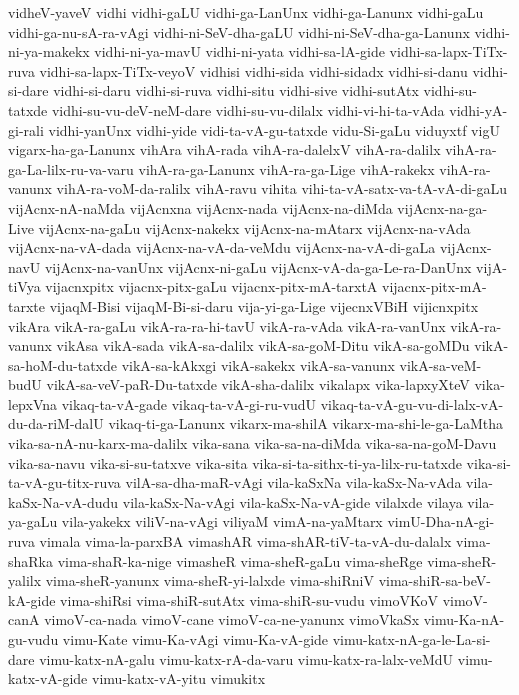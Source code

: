 {vidheV-yaveV
vidhi
vidhi-gaLU
vidhi-ga-LanUnx
vidhi-ga-Lanunx
vidhi-gaLu
vidhi-ga-nu-sA-ra-vAgi
vidhi-ni-SeV-dha-gaLU
vidhi-ni-SeV-dha-ga-Lanunx
vidhi-ni-ya-makekx
vidhi-ni-ya-mavU
vidhi-ni-yata
vidhi-sa-lA-gide
vidhi-sa-lapx-TiTx-ruva
vidhi-sa-lapx-TiTx-veyoV
vidhisi
vidhi-sida
vidhi-sidadx
vidhi-si-danu
vidhi-si-dare
vidhi-si-daru
vidhi-si-ruva
vidhi-situ
vidhi-sive
vidhi-sutAtx
vidhi-su-tatxde
vidhi-su-vu-deV-neM-dare
vidhi-su-vu-dilalx
vidhi-vi-hi-ta-vAda
vidhi-yA-gi-rali
vidhi-yanUnx
vidhi-yide
vidi-ta-vA-gu-tatxde
vidu-Si-gaLu
viduyxtf
vigU
vigarx-ha-ga-Lanunx
vihAra
vihA-rada
vihA-ra-dalelxV
vihA-ra-dalilx
vihA-ra-ga-La-lilx-ru-va-varu
vihA-ra-ga-Lanunx
vihA-ra-ga-Lige
vihA-rakekx
vihA-ra-vanunx
vihA-ra-voM-da-ralilx
vihA-ravu
vihita
vihi-ta-vA-satx-va-tA-vA-di-gaLu
vijAcnx-nA-naMda
vijAcnxna
vijAcnx-nada
vijAcnx-na-diMda
vijAcnx-na-ga-Live
vijAcnx-na-gaLu
vijAcnx-nakekx
vijAcnx-na-mAtarx
vijAcnx-na-vAda
vijAcnx-na-vA-dada
vijAcnx-na-vA-da-veMdu
vijAcnx-na-vA-di-gaLa
vijAcnx-navU
vijAcnx-na-vanUnx
vijAcnx-ni-gaLu
vijAcnx-vA-da-ga-Le-ra-DanUnx
vijA-tiVya
vijacnxpitx
vijacnx-pitx-gaLu
vijacnx-pitx-mA-tarxtA
vijacnx-pitx-mA-tarxte
vijaqM-Bisi
vijaqM-Bi-si-daru
vija-yi-ga-Lige
vijecnxVBiH
vijicnxpitx
vikAra
vikA-ra-gaLu
vikA-ra-ra-hi-tavU
vikA-ra-vAda
vikA-ra-vanUnx
vikA-ra-vanunx
vikAsa
vikA-sada
vikA-sa-dalilx
vikA-sa-goM-Ditu
vikA-sa-goMDu
vikA-sa-hoM-du-tatxde
vikA-sa-kAkxgi
vikA-sakekx
vikA-sa-vanunx
vikA-sa-veM-budU
vikA-sa-veV-paR-Du-tatxde
vikA-sha-dalilx
vikalapx
vika-lapxyXteV
vika-lepxVna
vikaq-ta-vA-gade
vikaq-ta-vA-gi-ru-vudU
vikaq-ta-vA-gu-vu-di-lalx-vA-du-da-riM-dalU
vikaq-ti-ga-Lanunx
vikarx-ma-shilA
vikarx-ma-shi-le-ga-LaMtha
vika-sa-nA-nu-karx-ma-dalilx
vika-sana
vika-sa-na-diMda
vika-sa-na-goM-Davu
vika-sa-navu
vika-si-su-tatxve
vika-sita
vika-si-ta-sithx-ti-ya-lilx-ru-tatxde
vika-si-ta-vA-gu-titx-ruva
vilA-sa-dha-maR-vAgi
vila-kaSxNa
vila-kaSx-Na-vAda
vila-kaSx-Na-vA-dudu
vila-kaSx-Na-vAgi
vila-kaSx-Na-vA-gide
vilalxde
vilaya
vila-ya-gaLu
vila-yakekx
viliV-na-vAgi
viliyaM
vimA-na-yaMtarx
vimU-Dha-nA-gi-ruva
vimala
vima-la-parxBA
vimashAR
vima-shAR-tiV-ta-vA-du-dalalx
vima-shaRka
vima-shaR-ka-nige
vimasheR
vima-sheR-gaLu
vima-sheRge
vima-sheR-yalilx
vima-sheR-yanunx
vima-sheR-yi-lalxde
vima-shiRniV
vima-shiR-sa-beV-kA-gide
vima-shiRsi
vima-shiR-sutAtx
vima-shiR-su-vudu
vimoVKoV
vimoV-canA
vimoV-ca-nada
vimoV-cane
vimoV-ca-ne-yanunx
vimoVkaSx
vimu-Ka-nA-gu-vudu
vimu-Kate
vimu-Ka-vAgi
vimu-Ka-vA-gide
vimu-katx-nA-ga-le-La-si-dare
vimu-katx-nA-galu
vimu-katx-rA-da-varu
vimu-katx-ra-lalx-veMdU
vimu-katx-vA-gide
vimu-katx-vA-yitu
vimukitx
}
